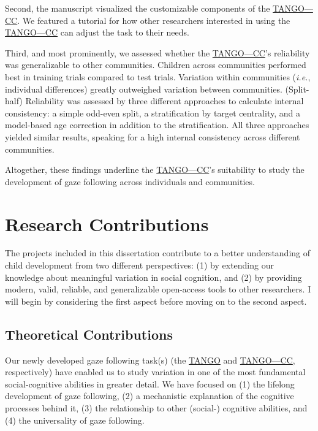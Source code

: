 \documentclass[
]{scrbook}
\begin{document}
Second, the manuscript visualized the customizable components of the \hyperref[acronyms_TANGOux2014CC]{TANGO---CC}. We featured a tutorial for how other researchers interested in using the \hyperref[acronyms_TANGOux2014CC]{TANGO---CC} can adjust the task to their needs.

Third, and most prominently, we assessed whether the \hyperref[acronyms_TANGOux2014CC]{TANGO---CC}'s reliability was generalizable to other communities. Children across communities performed best in training trials compared to test trials. Variation within communities (\emph{i.e.}, individual differences) greatly outweighed variation between communities. (Split-half) Reliability was assessed by three different approaches to calculate internal consistency: a simple odd-even split, a stratification by target centrality, and a model-based age correction in addition to the stratification. All three approaches yielded similar results, speaking for a high internal consistency across different communities.

Altogether, these findings underline the \hyperref[acronyms_TANGOux2014CC]{TANGO---CC}'s suitability to study the development of gaze following across individuals and communities.

\section{Research Contributions}\label{research-contributions}

The projects included in this dissertation contribute to a better understanding of child development from two different perspectives: (1) by extending our knowledge about meaningful variation in social cognition, and (2) by providing modern, valid, reliable, and generalizable open-access tools to other researchers. I will begin by considering the first aspect before moving on to the second aspect.

\subsection{Theoretical Contributions}\label{theoreticalcontributions}

Our newly developed gaze following task(s) (the \hyperref[acronyms_TANGO]{TANGO} and \hyperref[acronyms_TANGOux2014CC]{TANGO---CC}, respectively) have enabled us to study variation in one of the most fundamental social-cognitive abilities in greater detail. We have focused on (1) the lifelong development of gaze following, (2) a mechanistic explanation of the cognitive processes behind it, (3) the relationship to other (social-) cognitive abilities, and (4) the universality of gaze following.
\end{document}
